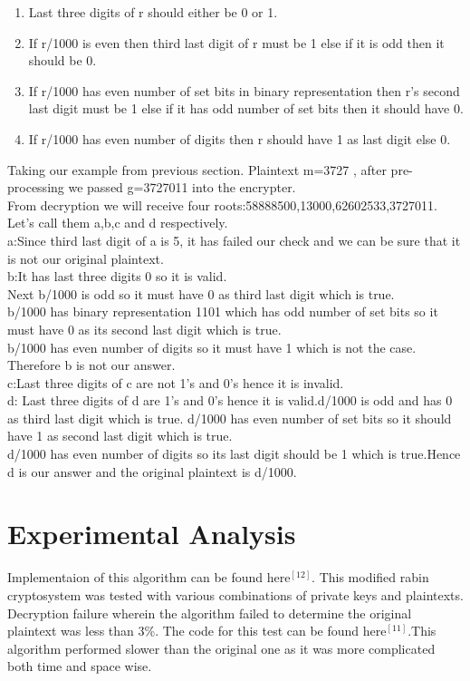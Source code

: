 \documentclass[letterpaper, 12 pt, conference]{ieeeconf}  %
\begin{document}
\begin{enumerate}
  \item Last three digits of r should either be 0 or 1.
  \item If r/1000 is even then third last digit of r must be 1 else if it is odd then it should be 0.
  \item If r/1000 has even number of set bits in binary representation then r's second last digit must be 1 else if it has odd number of set bits then it should have 0.
   \item If r/1000 has even number of digits then r should have 1 as last digit else 0.
    \end{enumerate}



Taking our example from previous section. Plaintext m=3727 , after pre-processing we passed g=3727011 into the encrypter.
\\From decryption we will receive four roots:58888500,13000,62602533,3727011. Let's call them a,b,c and d respectively.
\\a:Since third last digit of a is 5, it has failed our check and we can be sure that it is not our original plaintext.
\\b:It has last three digits 0 so it is valid.
\\Next b/1000 is odd so it must have 0 as third last digit which is true.
\\b/1000 has binary representation 1101 which  has odd number of set bits so it must have 0 as its second last digit which is true.
\\b/1000 has even number of digits so it must have 1 which is not the case. Therefore b is not our answer.
\\c:Last three digits of c are not 1's and 0's hence it is invalid.
\\d: Last three digits of d are 1's and 0's hence it is valid.d/1000 is odd and has 0 as third last digit which is true. d/1000 has even number of set bits so it should have 1 as second last digit which is true. \\d/1000 has even number of digits so its last digit should be 1 which is true.Hence d is our answer and the original plaintext is d/1000.
\section{Experimental Analysis}
Implementaion of this algorithm can be found here$^{[12]}$. This modified rabin cryptosystem was tested with various combinations of private keys and plaintexts. Decryption failure wherein the algorithm failed to determine the original plaintext was less than 3\%. The code for this test can be found here$^{[11]}$.This algorithm performed slower than the original one as it was more complicated both time and space wise.
\end{document}
